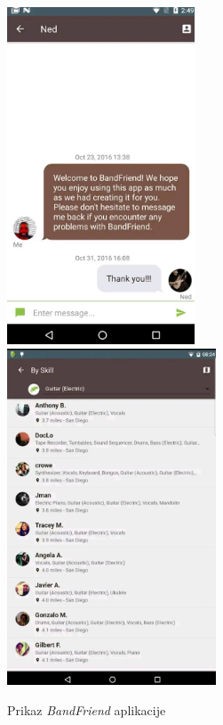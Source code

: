 		\begin{figure}[H]
			\begin{center}
				\includegraphics[height=10cm]{slike/BandFriend.JPEG}
				\includegraphics[height=10cm]{slike/BandFriend2.JPEG}
			\end{center}
			\caption{Prikaz \textit{BandFriend} aplikacije}
			\label{fig:promjene3}
		\end{figure}

		
		\eject
		
	